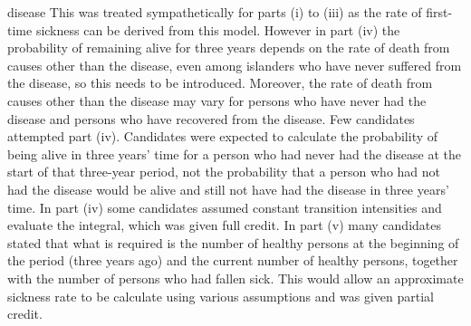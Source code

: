 \documentclass[a4paper,12pt]{article}
\begin{document}
\begin{itemize}
disease
\newpage
This was treated sympathetically for parts (i) to (iii) as the rate of first-time sickness can be derived from this model. However in part (iv) the probability of remaining alive for three years depends on the rate of death from causes other than the disease, even among islanders who have never suffered from the disease, so this needs to be introduced. Moreover, the rate
of death from causes other than the disease may vary for persons who have never had the
disease and persons who have recovered from the disease.
Few candidates attempted part (iv). Candidates were expected to calculate the probability of
being alive in three years’ time for a person who had never had the disease at the start of that three-year period, not the probability that a person who had not had the disease would be alive and still not have had the disease in three years’ time. In part (iv) some candidates
assumed constant transition intensities and evaluate the integral, which was given full credit.
In part (v) many candidates stated that what is required is the number of healthy persons at the beginning of the period (three years ago) and the current number of healthy persons, together with the number of persons who had fallen sick. This would allow an approximate sickness rate to be calculate using various assumptions and was given partial
credit.
\end{itemize}
\end{document}
